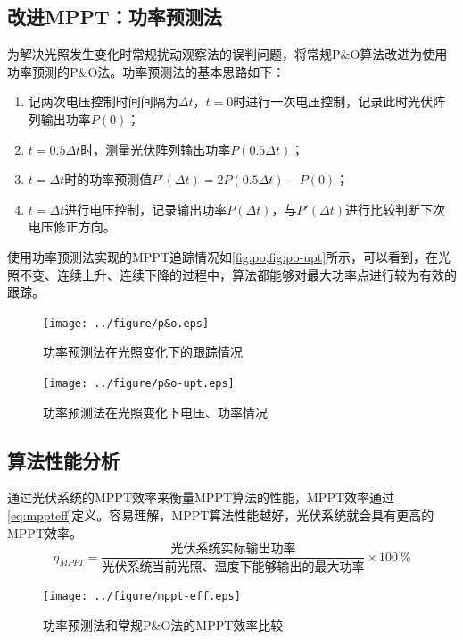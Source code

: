 \documentclass[a4paper,12pt]{article}
\begin{document}
    \subsection{改进MPPT：功率预测法} %
    \label{sub:改进mppt_功率预测法}
    为解决光照发生变化时常规扰动观察法的误判问题，将常规P\&O算法改进为使用功率预测的P\&O法。功率预测法的基本思路如下：
    \begin{enumerate}
      \item 记两次电压控制时间间隔为$\Delta t$，$t=0$时进行一次电压控制，记录此时光伏阵列输出功率$P\left(0\right)$；
      \item $t=0.5\Delta t$时，测量光伏阵列输出功率$P\left(0.5\Delta t\right)$；
      \item $t=\Delta t$时的功率预测值$P'\left(\Delta t\right)=2P\left(0.5\Delta t\right)-P\left(0\right)$；
      \item $t=\Delta t$进行电压控制，记录输出功率$P\left(\Delta t\right)$，与$P'\left(\Delta t\right)$进行比较判断下次电压修正方向。
    \end{enumerate}
    使用功率预测法实现的MPPT追踪情况如\cref{fig:po,fig:po-upt}所示，可以看到，在光照不变、连续上升、连续下降的过程中，算法都能够对最大功率点进行较为有效的跟踪。
    \begin{figure}[htbp]
        \centering
        \texttt{[image: ../figure/p\&o.eps]}
        \caption{功率预测法在光照变化下的跟踪情况}
        \label{fig:po}
    \end{figure}
    \begin{figure}[htbp]
        \centering
        \texttt{[image: ../figure/p\&o-upt.eps]}
        \caption{功率预测法在光照变化下电压、功率情况}
        \label{fig:po-upt}
    \end{figure}
    \subsection{算法性能分析} %
    \label{sub:算法性能分析}
    通过光伏系统的MPPT效率来衡量MPPT算法的性能，MPPT效率通过\cref{eq:mppteff}定义。容易理解，MPPT算法性能越好，光伏系统就会具有更高的MPPT效率。
    \begin{equation}\label{eq:mppteff}
      \eta_{MPPT}=\frac{\text{光伏系统实际输出功率}}{\text{光伏系统当前光照、温度下能够输出的最大功率}}\times\SI{100}{\percent}
    \end{equation}
    \begin{figure}[htbp]
        \centering
        \texttt{[image: ../figure/mppt-eff.eps]}
        \caption{功率预测法和常规P\&O法的MPPT效率比较}
        \label{fig:mppt-eff}
    \end{figure}
    
\end{document}
